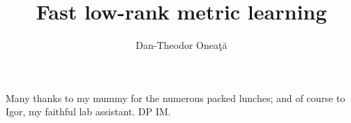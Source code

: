 \documentclass[msc,ai,logo,notimes]{infthesis}  %
\title{Fast low-rank metric learning}
\author{Dan-Theodor Onea\c{t}\u{a}}
\begin{document}
\begin{preliminary}

\maketitle

\begin{acknowledgements}
Many thanks to my mummy for the numerous packed lunches; and of course to
Igor, my faithful lab assistant. DP IM.
\end{acknowledgements}

\standarddeclaration


\tableofcontents


\end{preliminary}







\appendix


% 

%



\singlespace



\end{document}
